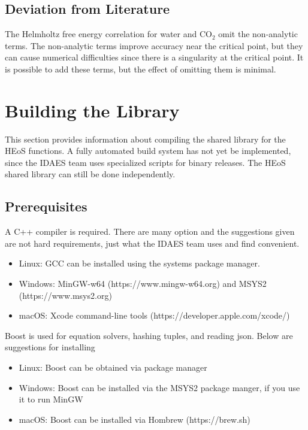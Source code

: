 \documentclass[oneside]{book}
\begin{document}
\section{Deviation from Literature}

The Helmholtz free energy correlation for water \cite{doi:10.1063/1.1461829} and CO$_2$ \cite{osti_402357} omit the non-analytic terms.  The non-analytic terms improve accuracy near the critical point, but they can cause numerical difficulties since there is a singularity at the critical point.  It is possible to add these terms, but the effect of omitting them is minimal.

\chapter{Building the Library}

This section provides information about compiling the shared library for the HEoS functions. A fully automated build system has not yet be implemented, since the IDAES team uses specialized scripts for binary releases.  The HEoS shared library can still be done independently.

\section{Prerequisites}

A C++ compiler is required. There are many option and the suggestions given are not hard requirements, just what the IDAES team uses and find convenient. 
\begin{itemize}
\item Linux: GCC can be installed using the systems package manager.
\item Windows: MinGW-w64 (https://www.mingw-w64.org) and MSYS2 (https://www.msys2.org)
\item macOS: Xcode command-line tools (https://developer.apple.com/xcode/)
\end{itemize}

Boost is used for equation solvers, hashing tuples, and reading json.  Below are suggestions for installing 
\begin{itemize}
\item Linux: Boost can be obtained via package manager
\item Windows: Boost can be installed via the MSYS2 package manger, if you use it to run MinGW
\item macOS: Boost can be installed via Hombrew (https://brew.sh)
\end{itemize}
\end{document}
